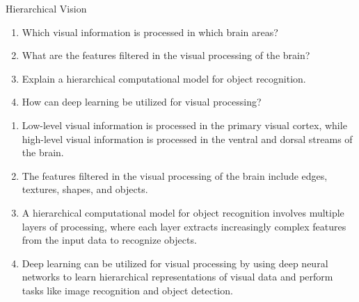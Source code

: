 \documentclass{article}
\begin{document}
\begin{exercise}{Hierarchical Vision}
  \begin{enumerate}
    \item Which visual information is processed in which brain areas?
    \item What are the features filtered in the visual processing of the brain?
    \item Explain a hierarchical computational model for object recognition.
    \item How can deep learning be utilized for visual processing?
  \end{enumerate}

  \begin{solution}
    \begin{enumerate}
      \item Low-level visual information is processed in the primary visual cortex, while high-level visual information is processed in the ventral and dorsal streams of the brain.
      \item The features filtered in the visual processing of the brain include edges, textures, shapes, and objects.
      \item A hierarchical computational model for object recognition involves multiple layers of processing, where each layer extracts increasingly complex features from the input data to recognize objects.
      \item Deep learning can be utilized for visual processing by using deep neural networks to learn hierarchical representations of visual data and perform tasks like image recognition and object detection.
    \end{enumerate}
  \end{solution}
\end{exercise}
\end{document}

